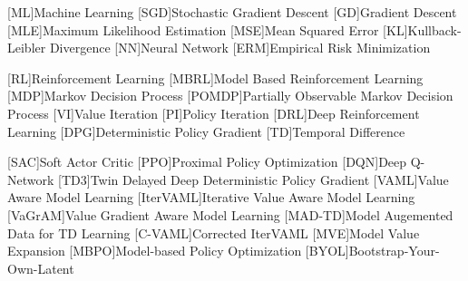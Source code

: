 [ML]{Machine Learning}
[SGD]{Stochastic Gradient Descent}
[GD]{Gradient Descent}
[MLE]{Maximum Likelihood Estimation}
[MSE]{Mean Squared Error}
[KL]{Kullback-Leibler Divergence}
[NN]{Neural Network}
[ERM]{Empirical Risk Minimization}

[RL]{Reinforcement Learning}
[MBRL]{Model Based Reinforcement Learning}
[MDP]{Markov Decision Process}
[POMDP]{Partially Observable Markov Decision Process}
[VI]{Value Iteration}
[PI]{Policy Iteration}
[DRL]{Deep Reinforcement Learning}
[DPG]{Deterministic Policy Gradient}
[TD]{Temporal Difference}

[SAC]{Soft Actor Critic}
[PPO]{Proximal Policy Optimization}
[DQN]{Deep Q-Network}
[TD3]{Twin Delayed Deep Deterministic Policy Gradient}
[VAML]{Value Aware Model Learning}
[IterVAML]{Iterative Value Aware Model Learning}
[VaGrAM]{Value Gradient Aware Model Learning}
[MAD-TD]{Model Augemented Data for TD Learning}
[C-VAML]{Corrected IterVAML}
[MVE]{Model Value Expansion}
[MBPO]{Model-based Policy Optimization}
[BYOL]{Bootstrap-Your-Own-Latent}
